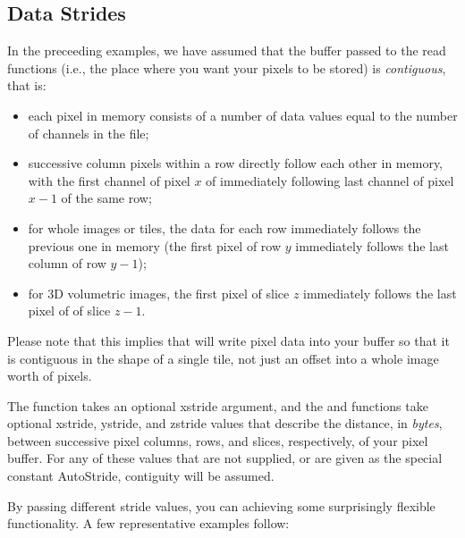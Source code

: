 

\subsection{Data Strides}
\label{sec:imageinput:strides}

In the preceeding examples, we have assumed that the buffer passed to
the {\cf read} functions (i.e., the place where you want your pixels
to be stored) is \emph{contiguous}, that is:

\begin{itemize}
\item each pixel in memory consists of a number of data values equal to
  the number of channels in the file;
\item successive column pixels within a row directly follow each other in
  memory, with the first channel of pixel $x$ of immediately following
  last channel of pixel $x-1$ of the same row;
\item for whole images or tiles, the data for each row
  immediately follows the previous one in memory (the first pixel of row
  $y$ immediately follows the last column of row $y-1$);
\item for 3D volumetric images, the first pixel of slice $z$ immediately
  follows the last pixel of of slice $z-1$.
\end{itemize}

Please note that this implies that \readtile will write pixel data into
your buffer so that it is contiguous in the shape of a single tile, not
just an offset into a whole image worth of pixels.

The \readscanline function takes an optional {\cf xstride} argument, and
the \readimage and \readtile functions take optional {\cf xstride}, 
{\cf ystride}, and {\cf zstride} values that describe the distance, in
\emph{bytes}, between successive pixel columns, rows, and slices,
respectively, of your pixel buffer.  For any of these values that are
not supplied, or are given as the special constant {\cf AutoStride},
contiguity will be assumed.

By passing different stride values, you can achieving some surprisingly
flexible functionality.  A few representative examples follow:

